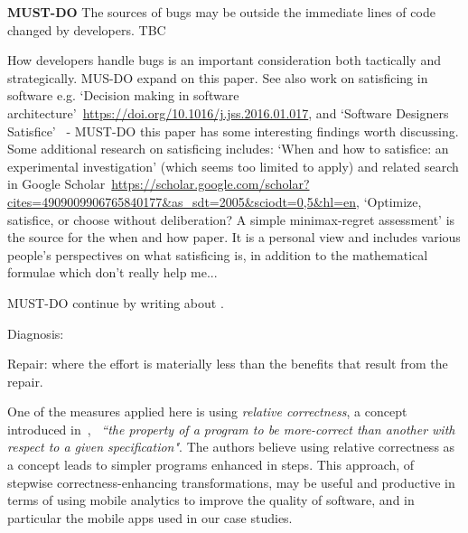 \textbf{MUST-DO} The sources of bugs may be outside the immediate lines of code changed by developers. TBC~\citep{10.1145/3239235.3267436}

How developers handle bugs is an important consideration both tactically and strategically. \citet{lopez2021_bumps_in_the_code_error_handling_during_software_development} MUS-DO expand on this paper. See also work on satisficing in software e.g. `Decision making in software architecture'~\url{https://doi.org/10.1016/j.jss.2016.01.017}, and `Software Designers Satisfice'~\citep{tang2015_software_designers_satisfice} - MUST-DO this paper has some interesting findings worth discussing. 
%
Some additional research on satisficing includes: `When and how to satisfice: an experimental investigation' (which seems too limited to apply) and related search in Google Scholar~\url{https://scholar.google.com/scholar?cites=4909009906765840177&as_sdt=2005&sciodt=0,5&hl=en}, `Optimize, satisfice, or choose without deliberation? A simple minimax-regret assessment' is the source for the when and how paper. It is a personal view and includes various people's perspectives on what satisficing is, in addition to the mathematical formulae which don't really help me...



MUST-DO continue by writing about \citep{avizienis2004_basic_concepts_and_taxonomy}.


Diagnosis:

Repair: where the effort is materially less than the benefits that result from the repair. 


One of the measures applied here is using \emph{relative correctness}, a concept introduced in~\cite{diallo2015_correctness_and_relative_correctness}, ~\emph{``the
property of a program to be more-correct than another with respect to a given specification"}. The authors believe using relative correctness as a concept leads to simpler programs enhanced  in steps. This approach, of stepwise correctness-enhancing transformations, may be useful and productive in terms of using mobile analytics to improve the quality of software, and in particular the mobile apps used in our case studies. 

